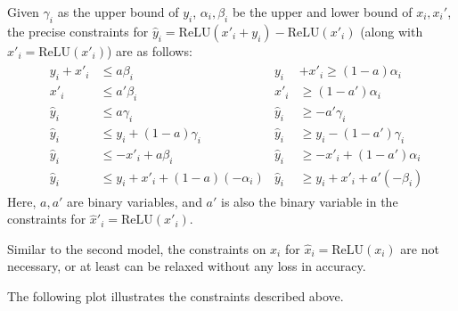 \documentclass[letterpaper]{article} %
\newcommand{\ReLU}{\mathrm{ReLU}}
\begin{document}
	
	
	Given $\gamma_i$ as the upper bound of $y_i$, $\alpha_i,\beta_i$ be the upper and lower bound of $x_i,x_i'$, 
	the precise  constraints for $\hat{y}_i = \ReLU(x'_i+y_i)-\ReLU(x'_i)$ (along with $\hat{x}'_i=\ReLU(x'_i)$) are as follows:
	\begin{align*}
		& \begin{aligned}
			y_i + x'_i &\leq a\beta_i        &
			y_i &+ x'_i \geq (1-a)\alpha_i \\
			x'_i       &\leq a'\beta_i       & 
			x'_i       &\geq (1-a')\alpha_i \\
			\hat{y}_i  &\leq a\gamma_i       &
			\hat{y}_i  &\geq -a'\gamma_i \\
			\hat{y}_i  &\leq y_i + (1-a)\gamma_i  &
			\hat{y}_i  &\geq y_i - (1-a')\gamma_i \\
			\hat{y}_i  &\leq -x'_i + a\beta_i &
			\hat{y}_i  &\geq -x'_i + (1-a')\alpha_i \\
			\hat{y}_i  &\leq y_i + x'_i + (1-a)(-\alpha_i) &
			\hat{y}_i  &\geq y_i + x'_i + a'(-\beta_i)
		\end{aligned}
	\end{align*} Here, $a,a'$ are binary variables, and $a'$ is also the binary variable in the constraints for $\hat{x}'_i=\ReLU(x'_i)$. 
	
	Similar to the second model, the constraints on $x_i$ for $\hat{x}_i=\ReLU(x_i)$ are not necessary, or at least can be relaxed without any loss in accuracy.
	
	
	The following plot illustrates the constraints described above.
	
\end{document}
